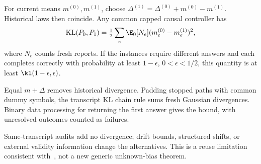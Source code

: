 \begin{proposition}
\label{prop:v37-nuisance}
For current means $m^{(0)},m^{(1)}$, choose $\Delta^{(1)}=\Delta^{(0)}+m^{(0)}-m^{(1)}$. Historical laws then coincide. Any common capped causal controller has
$$\operatorname{KL}(P_0,P_1)=\tfrac12\sum_e\E_0[N_e](m_e^{(0)}-m_e^{(1)})^2,$$
where $N_e$ counts fresh reports. If the instances require different answers and each completes correctly with probability at least $1-\epsilon$, $0<\epsilon<1/2$, this quantity is at least $\kl(1-\epsilon,\epsilon)$.
\end{proposition}
\begin{IEEEproof}
Equal $m+\Delta$ removes historical divergence. Padding stopped paths with common dummy symbols, the transcript KL chain rule sums fresh Gaussian divergences. Binary data processing for returning the first answer gives the bound, with unresolved outcomes counted as failures.
\end{IEEEproof}
Same-transcript audits add no divergence; drift bounds, structured shifts, or external validity information change the alternatives. This is a reuse limitation consistent with~\cite{yang2025}, not a new generic unknown-bias theorem.

